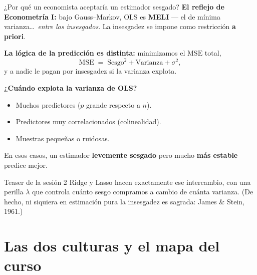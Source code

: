 \documentclass{beamer}
\newcommand{\1}{\mathbb{I}}
\newcommand{\MSE}{\mathrm{MSE}}
\begin{document}
\begin{frame}{¿Por qué un economista aceptaría un estimador sesgado?}
\small
\textbf{El reflejo de Econometría I:} bajo Gauss--Markov, OLS es \textbf{MELI} --- el de mínima varianza\ldots\ \emph{entre los insesgados}. La insesgadez se impone como restricción \textbf{a priori}.
\pause

\vspace{0.2cm}
\textbf{La lógica de la predicción es distinta:} minimizamos el $\MSE$ total,
\[ \MSE \;=\; \text{Sesgo}^2 + \text{Varianza} + \sigma^2, \]
y a nadie le pagan por insesgadez si la varianza explota.
\pause

\vspace{0.2cm}
\textbf{¿Cuándo explota la varianza de OLS?}
\begin{itemize}\itemsep3pt
  \item Muchos predictores ($p$ grande respecto a $n$).
  \item Predictores muy correlacionados (colinealidad).
  \item Muestras pequeñas o ruidosas.
\end{itemize}
En esos casos, un estimador \textbf{levemente sesgado} pero mucho \textbf{más estable} predice mejor.
\pause

\vspace{0.2cm}
\begin{block}{Teaser de la sesión 2}
Ridge y Lasso hacen exactamente ese intercambio, con una perilla $\lambda$ que controla cuánto sesgo compramos a cambio de cuánta varianza. (De hecho, ni siquiera en estimación pura la insesgadez es sagrada: James \& Stein, 1961.)
\end{block}
\end{frame}


\section{Las dos culturas y el mapa del curso}
\begin{frame}[noframenumbering]
\tableofcontents[currentsection]
\end{frame}
\end{document}
